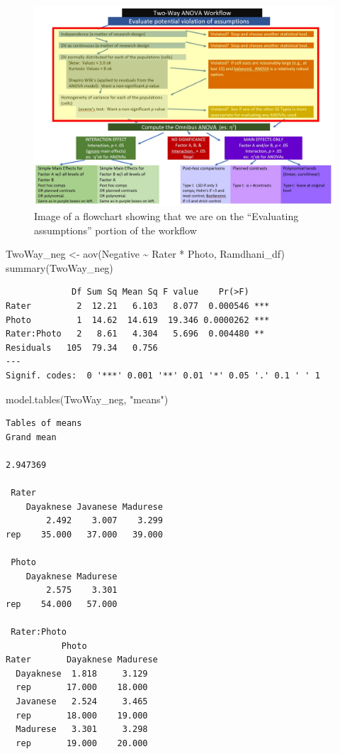 \documentclass[
  11pt,
]{book}
\newenvironment{Shaded}{\begin{snugshade}}{\end{snugshade}}
\newcommand{\FunctionTok}[1]{\textcolor[rgb]{0.00,0.00,0.00}{#1}}
\newcommand{\NormalTok}[1]{#1}
\newcommand{\OtherTok}[1]{\textcolor[rgb]{0.56,0.35,0.01}{#1}}
\newcommand{\SpecialCharTok}[1]{\textcolor[rgb]{0.00,0.00,0.00}{#1}}
\newcommand{\StringTok}[1]{\textcolor[rgb]{0.31,0.60,0.02}{#1}}
\begin{document}
\begin{figure}
\centering
\includegraphics{images/factorial/WrkFlw_Assumptions.jpg}
\caption{Image of a flowchart showing that we are on the ``Evaluating assumptions'' portion of the workflow}
\end{figure}

\begin{Shaded}
\begin{Highlighting}[]
\NormalTok{TwoWay\_neg }\OtherTok{\textless{}{-}} \FunctionTok{aov}\NormalTok{(Negative }\SpecialCharTok{\textasciitilde{}}\NormalTok{ Rater }\SpecialCharTok{*}\NormalTok{ Photo, Ramdhani\_df)}
\FunctionTok{summary}\NormalTok{(TwoWay\_neg)}
\end{Highlighting}
\end{Shaded}

\begin{verbatim}
             Df Sum Sq Mean Sq F value    Pr(>F)    
Rater         2  12.21   6.103   8.077  0.000546 ***
Photo         1  14.62  14.619  19.346 0.0000262 ***
Rater:Photo   2   8.61   4.304   5.696  0.004480 ** 
Residuals   105  79.34   0.756                      
---
Signif. codes:  0 '***' 0.001 '**' 0.01 '*' 0.05 '.' 0.1 ' ' 1
\end{verbatim}

\begin{Shaded}
\begin{Highlighting}[]
\FunctionTok{model.tables}\NormalTok{(TwoWay\_neg, }\StringTok{"means"}\NormalTok{)}
\end{Highlighting}
\end{Shaded}

\begin{verbatim}
Tables of means
Grand mean
         
2.947369 

 Rater 
    Dayaknese Javanese Madurese
        2.492    3.007    3.299
rep    35.000   37.000   39.000

 Photo 
    Dayaknese Madurese
        2.575    3.301
rep    54.000   57.000

 Rater:Photo 
           Photo
Rater       Dayaknese Madurese
  Dayaknese  1.818     3.129  
  rep       17.000    18.000  
  Javanese   2.524     3.465  
  rep       18.000    19.000  
  Madurese   3.301     3.298  
  rep       19.000    20.000  
\end{verbatim}
\end{document}
